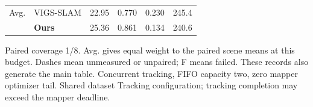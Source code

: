 \begin{table}[tbp]
{\begin{tabular}{@{}llcccc@{}}
\addlinespace[2pt]
\midrule
Avg. & VIGS-SLAM & 22.95 & 0.770 & 0.230 & 245.4 \\
 & \textbf{Ours} & 25.36 & 0.861 & 0.134 & 240.6 \\
\bottomrule
\end{tabular}}
\endgroup
\par\vspace{3pt}
\begin{minipage}{\linewidth}
\scriptsize\raggedright Paired coverage 1/8. Avg. gives equal weight to the paired scene means at this budget. Dashes mean unmeasured or unpaired; F means failed. These records also generate the main table. Concurrent tracking, FIFO capacity two, zero mapper optimizer tail. Shared dataset Tracking configuration; tracking completion may exceed the mapper deadline.
\end{minipage}
\end{table}

